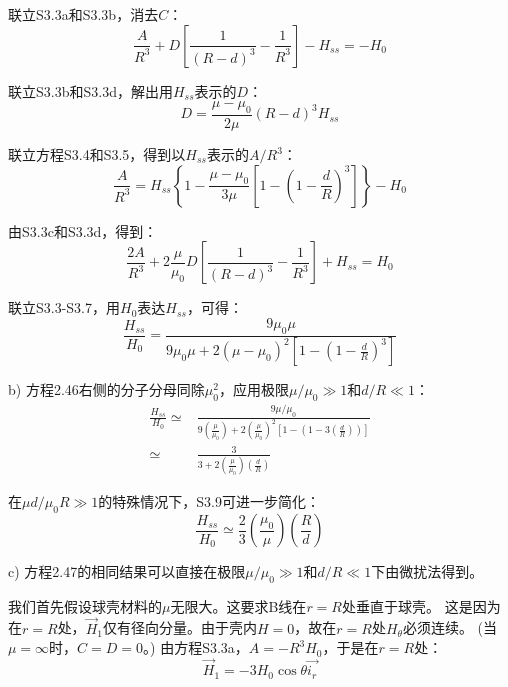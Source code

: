 联立S3.3a和S3.3b，消去$C$：
\begin{equation*}
\frac{A}{R^3}+D\left[\frac{1}{(R-d)^3}-\frac{1}{R^3}\right]-H_{ss} =-H_0 \tag{S3.4}
\end{equation*}


联立S3.3b和S3.3d，解出用$H_{ss}$表示的$D$：
\begin{equation*}
D=\frac{\mu-\mu_0}{2\mu} \left(R-d\right)^3 H_{ss}  \tag{S3.5}
\end{equation*}

联立方程S3.4和S3.5，得到以$H_{ss}$表示的$A/R^3$：
\begin{equation*}
\frac{A}{R^3}=H_{ss}\left\{1-\frac{\mu-\mu_0}{3\mu}\left[1-\left(1-\frac{d}{R}\right)^3\right]\right\}-H_0   \tag{S3.6}
\end{equation*}

由S3.3c和S3.3d，得到：
\begin{equation*}
\frac{2A}{R^3}+2\frac{\mu}{\mu_0}D\left[\frac{1}{(R-d)^3}-\frac{1}{R^3}\right]+H_{ss} =H_0  \tag{S3.7}
\end{equation*}

联立S3.3-S3.7，用$H_0$表达$H_{ss}$，可得：
\begin{equation*}
\frac{H_{ss}}{H_0}=\frac{9\mu_0 \mu}{9\mu_0 \mu+2(\mu-\mu_0)^2\left[1-\left(1-\frac{d}{R}\right)^3\right]}  \tag{2.46}
\end{equation*}

b) 方程2.46右侧的分子分母同除$\mu_0^2$，应用极限$\mu/\mu_0\gg 1$和$d/R\ll 1$：
\begin{align}
\frac{H_{ss}}{H_0}\simeq& \frac{9\mu/\mu_0}{9\left(\frac{\mu}{\mu_0}\right)+2\left(\frac{\mu}{\mu_0}\right)^2\left[1-\left(1-3\left(\frac{d}{R}\right)\right)\right]} \nonumber\tag{S3.8}\\
\simeq&\frac{3}{3+2\left(\frac{\mu}{\mu_0}\right)\left(\frac{d}{R}\right)}\nonumber \tag{S3.9}
\end{align}

在$\mu d/\mu_0 R \gg 1$的特殊情况下，S3.9可进一步简化：
\begin{equation*}
\frac{H_{ss}}{H_0}\simeq \frac{2}{3}\left(\frac{\mu_0}{\mu}\right)\left(\frac{R}{d}\right)  \tag{2.47}
\end{equation*}

c) 方程2.47的相同结果可以直接在极限$\mu/\mu_0\gg 1$和$d/R\ll 1$下由微扰法得到。

我们首先假设球壳材料的$\mu$无限大。这要求B线在$r=R$处垂直于球壳。
这是因为在$r=R$处，$\vec{H}_1$仅有径向分量。由于壳内$H=0$，故在$r=R$处$H_\theta$必须连续。
(当$\mu=\infty$时，$C=D=0$。)
由方程S3.3a，$A=-R^3 H_0$，于是在$r=R$处：
\begin{equation*}
\vec{H}_1=-3 H_0 \cos\theta \vec{i_r} \tag{S3.10}
\end{equation*}

